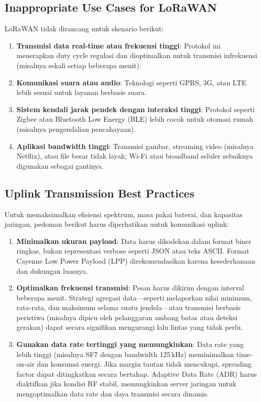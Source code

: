 \subsection{Inappropriate Use Cases for LoRaWAN}
LoRaWAN tidak dirancang untuk skenario berikut:
\begin{enumerate}
    \item \textbf{Transmisi data real-time atau frekuensi tinggi}: Protokol ini menerapkan duty cycle regulasi dan dioptimalkan untuk transmisi infrekuensi (misalnya sekali setiap beberapa menit).
    \item \textbf{Komunikasi suara atau audio}: Teknologi seperti GPRS, 3G, atau LTE lebih sesuai untuk layanan berbasis suara.
    \item \textbf{Sistem kendali jarak pendek dengan interaksi tinggi}: Protokol seperti Zigbee atau Bluetooth Low Energy (BLE) lebih cocok untuk otomasi rumah (misalnya pengendalian pencahayaan).
    \item \textbf{Aplikasi bandwidth tinggi}: Transmisi gambar, streaming video (misalnya Netflix), atau file besar tidak layak; Wi-Fi atau broadband seluler sebaiknya digunakan sebagai gantinya.
\end{enumerate}
\subsection{Uplink Transmission Best Practices}
Untuk memaksimalkan efisiensi spektrum, masa pakai baterai, dan kapasitas jaringan, pedoman berikut harus diperhatikan untuk komunikasi uplink:
\begin{enumerate}
    \item \textbf{Minimalkan ukuran payload}: Data harus dikodekan dalam format biner ringkas, bukan representasi verbose seperti JSON atau teks ASCII. Format Cayenne Low Power Payload (LPP) direkomendasikan karena kesederhanaan dan dukungan luasnya.
    \item \textbf{Optimalkan frekuensi transmisi}: Pesan harus dikirim dengan interval beberapa menit. Strategi agregasi data—seperti melaporkan nilai minimum, rata-rata, dan maksimum selama suatu jendela—atau transmisi berbasis peristiwa (misalnya dipicu oleh pelanggaran ambang batas atau deteksi gerakan) dapat secara signifikan mengurangi lalu lintas yang tidak perlu.
    \item \textbf{Gunakan data rate tertinggi yang memungkinkan}: Data rate yang lebih tinggi (misalnya SF7 dengan bandwidth 125\,kHz) meminimalkan time-on-air dan konsumsi energi. Jika margin tautan tidak mencukupi, spreading factor dapat ditingkatkan secara bertahap. Adaptive Data Rate (ADR) harus diaktifkan jika kondisi RF stabil, memungkinkan server jaringan untuk mengoptimalkan data rate dan daya transmisi secara dinamis.
\end{enumerate}
